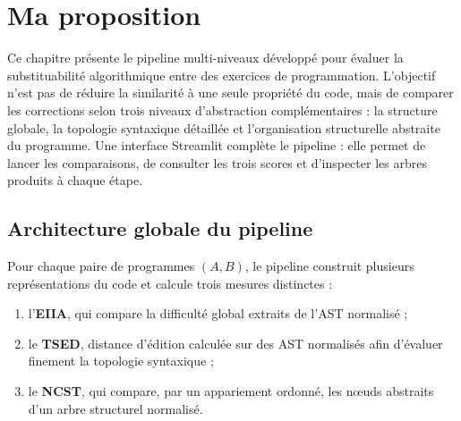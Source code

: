 \documentclass[12pt,a4paper,oneside]{report}
\begin{document}



\chapter{Ma proposition}

Ce chapitre présente le pipeline multi-niveaux développé pour évaluer la
substituabilité algorithmique entre des exercices de programmation. L'objectif
n'est pas de réduire la similarité à une seule propriété du code, mais de
comparer les corrections selon trois niveaux d'abstraction complémentaires : la
structure globale, la topologie syntaxique détaillée et l'organisation
structurelle abstraite du programme. Une interface Streamlit complète le
pipeline : elle permet de lancer les comparaisons, de consulter les trois
scores et d'inspecter les arbres produits à chaque étape.

\section{Architecture globale du pipeline}

Pour chaque paire de programmes $(A,B)$, le pipeline construit plusieurs
représentations du code et calcule trois mesures distinctes :
\begin{enumerate}
  \item l'\textbf{EIIA}, qui compare la difficulté global  extraits
        de l'AST normalisé ;
  \item le \textbf{TSED}, distance d'édition calculée sur des AST normalisés
        afin d'évaluer finement la topologie syntaxique ;
  \item le \textbf{NCST}, qui compare, par un appariement ordonné, les nœuds
        abstraits d'un arbre structurel normalisé.
\end{enumerate}
\end{document}
